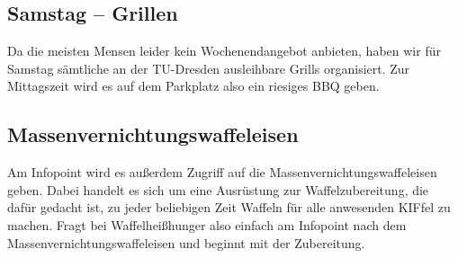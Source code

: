 \subsection*{Samstag -- Grillen}
Da die meisten Mensen leider kein Wochenendangebot anbieten, haben wir für Samstag sämtliche an der TU-Dresden ausleihbare Grills organisiert.
Zur Mittagszeit wird es auf dem Parkplatz also ein riesiges BBQ geben.


\subsection*{Massenvernichtungswaffeleisen}
Am Infopoint wird es außerdem Zugriff auf die Massenvernichtungswaffeleisen geben.
Dabei handelt es sich um eine Ausrüstung zur Waffelzubereitung, die dafür gedacht ist, zu jeder beliebigen Zeit Waffeln für alle anwesenden KIFfel zu machen.
Fragt bei Waffelheißhunger also einfach am Infopoint nach dem Massenvernichtungswaffeleisen und beginnt mit der Zubereitung.
